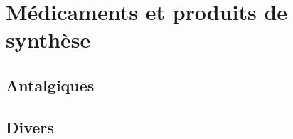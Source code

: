 \section{Médicaments et produits de synthèse}

\subsection{Antalgiques}

\begin{boiteCodeTex}{}
  \chemfig{!\aspirineSemiDev}
  \chemfig{!\aspirine} \qq{}
  \chemfig{!\acideSalicylique}
\end{boiteCodeTex}

\begin{boiteCodeTex}{}
  \chemfig{!\paracetamol}
  \chemfig{!\paracetamolSemiDev}
  \chemfig{!\paracetamolDev}
\end{boiteCodeTex}

\begin{boiteCodeTex}{}
  \chemfig{!\aspartame}
\end{boiteCodeTex}
  
\subsection{Divers}

\begin{boiteCodeTex}{}
  \chemfig{!\bisphenolA} \qq{}
  \chemfig{!\bisphenolASemiDev}
\end{boiteCodeTex}
